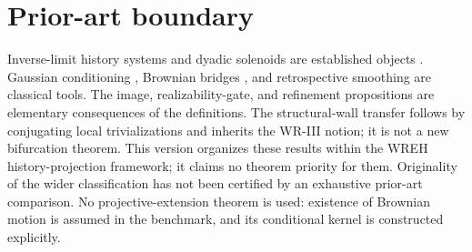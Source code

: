 \documentclass[11pt]{article}
\begin{document}
\section{Prior-art boundary}
Inverse-limit history systems and dyadic solenoids are established
objects \cite[Section 1]{ClarkFokkink2004}. Gaussian conditioning
\cite[Appendix A.1]{SarkkaSvensson2023}, Brownian bridges
\cite{Pitman2003}, and retrospective smoothing
\cite{RauchTungStriebel1965} are classical tools.
The image, realizability-gate, and refinement propositions are
elementary consequences of the definitions. The structural-wall
transfer follows by conjugating local trivializations and inherits
the WR-III notion; it is not a new bifurcation theorem. This version organizes these results within
the WREH history-projection framework; it claims no theorem priority
for them. Originality of the wider classification has not been
certified by an exhaustive prior-art comparison.
No projective-extension theorem is used: existence of Brownian motion
is assumed in the benchmark, and its conditional kernel is constructed
explicitly.
\end{document}
